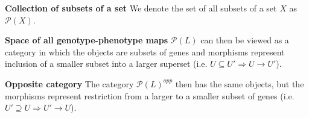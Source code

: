 \begin{frame}
\begin{block}{\textbf{Collection of subsets of a set}}
We denote the set of all subsets of a set $X$ as $\mathcal{P}(X)$.
\end{block}
\begin{block}{\textbf{Space of all genotype-phenotype maps}}
$\mathcal{P}(L)$ can then be viewed as a category in which the objects are subsets of genes and morphisms represent inclusion of a smaller subset into a larger superset (i.e. $U \subseteq U' \Rightarrow U \rightarrow U'$).
\end{block}
\begin{block}{\textbf{Opposite category}}
The category $\mathcal{P}(L)^{opp}$ then has the same objects, but the morphisms represent restriction from a larger to a smaller subset of genes (i.e. $U' \supseteq U \Rightarrow U' \rightarrow U$).
\end{block}
\end{frame}



